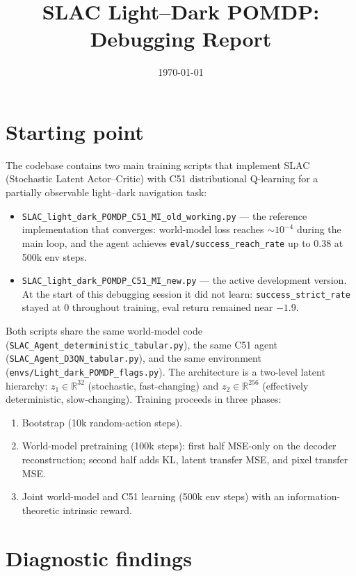 \documentclass[11pt,a4paper]{article}
\title{SLAC Light--Dark POMDP: Debugging Report}
\author{}
\date{\today}
\begin{document}
\maketitle

\section{Starting point}

The codebase contains two main training scripts that implement SLAC (Stochastic
Latent Actor--Critic) with C51 distributional Q-learning for a partially
observable light--dark navigation task:

\begin{itemize}[leftmargin=*]
  \item \texttt{SLAC\_light\_dark\_POMDP\_C51\_MI\_old\_working.py} --- the
        reference implementation that converges: world-model loss reaches
        $\sim 10^{-4}$ during the main loop, and the agent achieves
        \texttt{eval/success\_reach\_rate} up to $0.38$ at 500k env steps.
  \item \texttt{SLAC\_light\_dark\_POMDP\_C51\_MI\_new.py} --- the active
        development version. At the start of this debugging session it did not
        learn: \texttt{success\_strict\_rate} stayed at $0$ throughout
        training, eval return remained near $-1.9$.
\end{itemize}

Both scripts share the same world-model code
(\texttt{SLAC\_Agent\_deterministic\_tabular.py}), the same C51 agent
(\texttt{SLAC\_Agent\_D3QN\_tabular.py}), and the same environment
(\texttt{envs/Light\_dark\_POMDP\_flags.py}). The architecture is a two-level
latent hierarchy: \(z_1 \in \mathbb{R}^{32}\) (stochastic, fast-changing) and
\(z_2 \in \mathbb{R}^{256}\) (effectively deterministic, slow-changing).
Training proceeds in three phases:
\begin{enumerate}[leftmargin=*]
  \item Bootstrap (10k random-action steps).
  \item World-model pretraining (100k steps): first half MSE-only on the
        decoder reconstruction; second half adds KL, latent transfer MSE, and
        pixel transfer MSE.
  \item Joint world-model and C51 learning (500k env steps) with an
        information-theoretic intrinsic reward.
\end{enumerate}

\section{Diagnostic findings}
\end{document}
